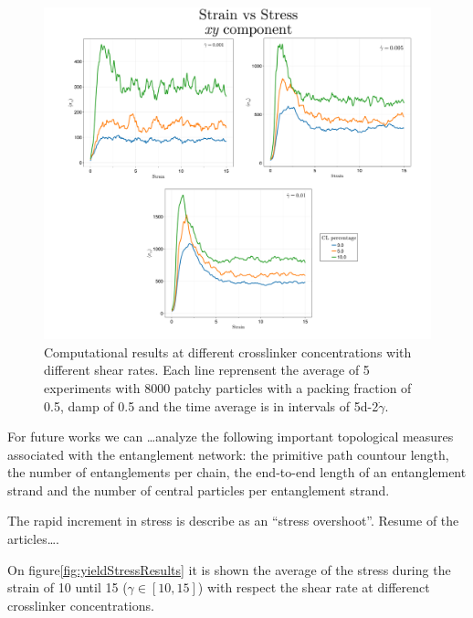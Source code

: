 \begin{figure}[ht!]
    \centering
    \includegraphics[width=\textwidth]{figs/ComputaitonalResults/zoom-clResponse.pdf}
    \caption{Computational results at different crosslinker concentrations with different shear rates. Each line reprensent the average of 5 experiments with \num{8000} patchy particles with a packing fraction of \num{0.5}, damp of \num{0.5} and the time average is in intervals of \num{5d-2}$\dot{\gamma}$.}\label{fig:stres-strainCLResults}
\end{figure}



For future works we can \dots analyze the following important topological measures associated with the entanglement network: the primitive path countour length, the number of entanglements per chain, the end-to-end length of an entanglement strand and the number of central particles per entanglement strand.




The rapid increment in stress is describe as an ``stress overshoot''.
Resume of the articles\ldots.

On figure\ref{fig:yieldStressResults} it is shown the average of the stress during the strain of \num{10} until \num{15} ($\gamma\in[10,15]$) with respect the shear rate at differenct crosslinker concentrations.

